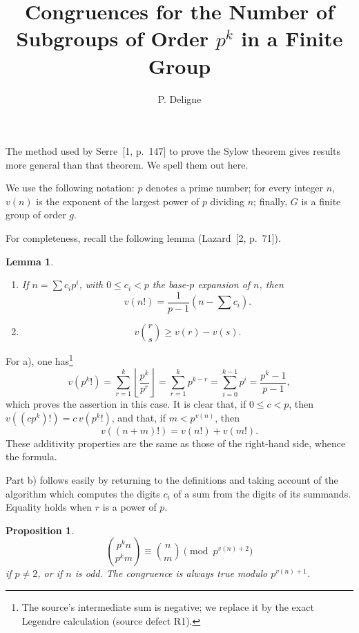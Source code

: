 \documentclass[12pt,reqno]{amsart}
\title{Congruences for the Number of Subgroups of Order $p^k$ in a Finite Group}
\author{P. Deligne}
\date{}
\theoremstyle{plain}
\newtheorem{lemma}{Lemma}
\newtheorem{proposition}{Proposition}
\begin{document}
\maketitle
\thispagestyle{empty}
\enlargethispage{4pt}

The method used by Serre~[1, p.~147] to prove the Sylow theorem gives results more general than that theorem. We spell them out here.

We use the following notation: $p$ denotes a prime number; for every integer $n$, $v(n)$ is the exponent of the largest power of $p$ dividing $n$; finally, $G$ is a finite group of order $g$.

For completeness, recall the following lemma (Lazard~[2, p.~71]).

\begin{lemma}\ \par
\begin{enumerate}
\item[a)] If $n = \sum c_i p^i$, with $0 \leq c_i < p$ the base-$p$ expansion of $n$, then
\[
v(n!) = \frac{1}{p-1}\left(n - \sum c_i\right).
\]
\item[b)]
\[
v\binom{r}{s} \geq v(r)-v(s).
\]
\end{enumerate}
\end{lemma}

For a), one has\footnote{The source's intermediate sum is negative; we
replace it by the exact Legendre calculation (source defect R1).}
\[
v(p^k!)=\sum_{r=1}^{k}\left\lfloor\frac{p^k}{p^r}\right\rfloor
=\sum_{r=1}^{k}p^{k-r}
=\sum_{i=0}^{k-1}p^i
=\frac{p^k-1}{p-1},
\]
which proves the assertion in this case. It is clear that, if $0\leq c<p$, then $v((cp^k)!)=c\,v(p^k!)$, and that, if $m<p^{v(n)}$, then
\[
v((n+m)!)=v(n!)+v(m!).
\]
These additivity properties are the same as those of the right-hand side, whence the formula.

Part b) follows easily by returning to the definitions and taking account of the algorithm which computes the digits $c_i$ of a sum from the digits of its summands. Equality holds when $r$ is a power of $p$.

\begin{proposition}
\[
\binom{p^k n}{p^k m}\equiv \binom{n}{m}\pmod {p^{v(n)+2}}
\]
if $p\neq 2$, or if $n$ is odd. The congruence is always true modulo $p^{v(n)+1}$.
\end{proposition}
\end{document}
